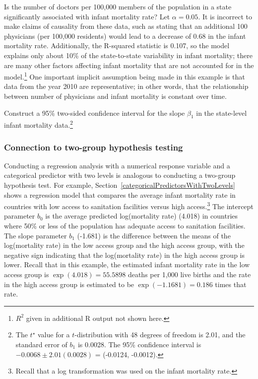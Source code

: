 \begin{example}{Is the number of doctors per 100,000 members of the population in a state significantly associated with infant mortality rate? Let $\alpha = 0.05$. }
It is incorrect to make claims of causality from these data, such as stating that an additional 100 physicians (per 100,000 residents) would lead to a decrease of 0.68 in the infant mortality rate. Additionally, the R-squared statistic is 0.107, so the model explains only about 10\% of the state-to-state variability in infant mortality; there are many other factors affecting infant mortality that are not accounted for in the model.\footnote{$R^2$ given in additional \textsf{R} output not shown here.}
One important implicit assumption being made in this example is that data from the year 2010 are representative; in other words, that the relationship between number of physicians and infant mortality is constant over time. 
\label{exampleInfantMortalityInference}		
\end{example}

\begin{exercise} Construct a 95\% two-sided confidence interval for the slope $\beta_{1}$ in the state-level infant mortality data.\footnote{The $t^{\star}$ value for a $t$-distribution with 48 degrees of freedom is 2.01, and the standard error of $b_1$ is 0.0028. The 95\% confidence interval is $-0.0068 \pm 2.01(0.0028)$ = (-0.0124, -0.0012). } 
\end{exercise}

\subsubsection{Connection to two-group hypothesis testing}
\label{categoricalTwoGroup}

Conducting a regression analysis with a numerical response variable and a categorical predictor with two levels is analogous to conducting a two-group hypothesis test. For example, Section~\ref{categoricalPredictorsWithTwoLevels} shows a regression model that compares the average infant mortality rate in countries with low access to sanitation facilities versus high access.\footnote{Recall that a log transformation was used on the infant mortality rate.} The intercept parameter $b_0$ is the average predicted log(mortality rate) (4.018) in countries where 50\% or less of the population has adequate access to sanitation facilities. The slope parameter $b_1$ (-1.681) is the difference between the means of the log(mortality rate) in the low access group and the high access group, with the negative sign indicating that the log(mortality rate) in the high access group is lower. Recall that in this example, the estimated infant mortality rate in the low access group is $\exp(4.018) = 55.5898$ deaths per 1,000 live births and the rate in the high access group is estimated to be $\exp(-1.1681) = 0.186$ times that rate.

